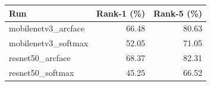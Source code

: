 \begin{tabular}{lrr}
\toprule
Run & Rank-1 (\%) & Rank-5 (\%) \\
\midrule
mobilenetv3\_arcface & 66.48 & 80.63 \\
mobilenetv3\_softmax & 52.05 & 71.05 \\
resnet50\_arcface & 68.37 & 82.31 \\
resnet50\_softmax & 45.25 & 66.52 \\
\bottomrule
\end{tabular}

